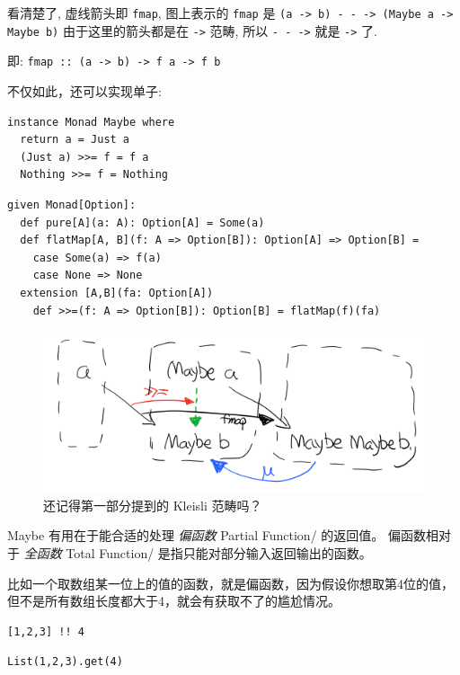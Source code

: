 \documentclass[letterspacing]{tufte-book}
\begin{document}
看清楚了, 虚线箭头即 \texttt{fmap}, 图上表示的 \texttt{fmap} 是 \texttt{(a -> b) - - -> (Maybe a -> Maybe b)} 由于这里的箭头都是在 \texttt{->} 范畴, 所以 \texttt{- - ->} 就是 \texttt{->} 了.

即: \texttt{fmap :: (a -> b) -> f a -> f b}

不仅如此，还可以实现单子:
\lstset{language=haskell,label= ,caption= ,captionpos=b,numbers=none}
\begin{lstlisting}
instance Monad Maybe where
  return a = Just a
  (Just a) >>= f = f a
  Nothing >>= f = Nothing
\end{lstlisting}

\lstset{language=scala,label= ,caption= ,captionpos=b,numbers=none}
\begin{lstlisting}
given Monad[Option]:
  def pure[A](a: A): Option[A] = Some(a)
  def flatMap[A, B](f: A => Option[B]): Option[A] => Option[B] =
    case Some(a) => f(a)
    case None => None
  extension [A,B](fa: Option[A])
    def >>=(f: A => Option[B]): Option[B] = flatMap(f)(fa)
\end{lstlisting}

\begin{figure}[htbp]
\centering
\includegraphics[width=.9\linewidth]{images/p2-maybe-kleisli.png}
\caption{还记得第一部分提到的 Kleisli 范畴吗？}
\end{figure}

Maybe 有用在于能合适的处理 \emph{偏函数} Partial Function/ 的返回值。
偏函数相对于 \emph{全函数} Total Function/ 是指只能对部分输入返回输出的函数。

比如一个取数组某一位上的值的函数，就是偏函数，因为假设你想取第4位的值，但不是所有数组长度都大于4，就会有获取不了的尴尬情况。
\lstset{language=haskell,label= ,caption= ,captionpos=b,numbers=none}
\begin{lstlisting}
[1,2,3] !! 4
\end{lstlisting}

\lstset{language=scala,label= ,caption= ,captionpos=b,numbers=none}
\begin{lstlisting}
List(1,2,3).get(4)
\end{lstlisting}
\end{document}
